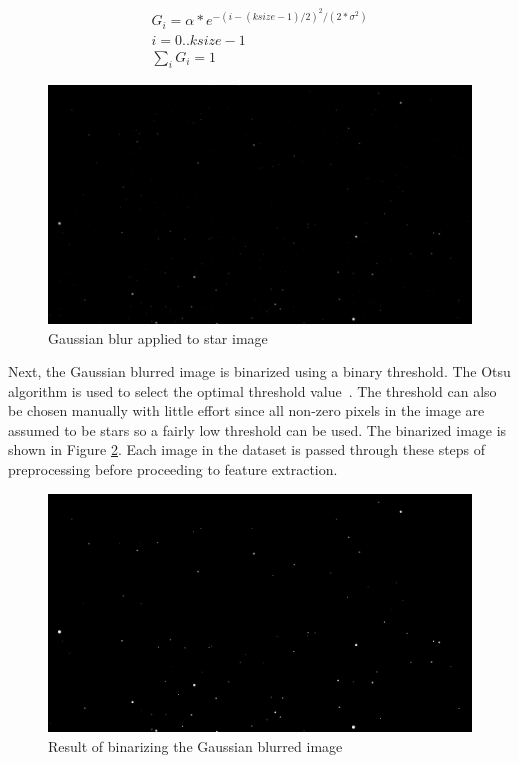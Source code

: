 \documentclass[10pt,twocolumn,letterpaper]{article}
\begin{document}
\begin{equation}
\begin{split}
  G_i = \alpha * e^{-(i-(ksize-1)/2)^2/(2*\sigma ^2)} \\
  i = 0..ksize-1\\
  \sum_i G_i = 1
  \label{eq:gauss}
\end{split}
\end{equation}

\begin{figure}[H]
  \centering
   \includegraphics[width=0.9\linewidth]{gauss}
   \caption{Gaussian blur applied to star image}
   \label{fig:star_gauss}
\end{figure}

Next, the Gaussian blurred image is binarized using a binary threshold. The Otsu algorithm is used to select the optimal threshold value~\cite{opencv}. The threshold can also be chosen manually with little effort since all non-zero pixels in the image are assumed to be stars so a fairly low threshold can be used. The binarized image is shown in Figure \ref{fig:star_binary}. Each image in the dataset is passed through these steps of preprocessing before proceeding to feature extraction.

\begin{figure}[H]
  \centering
   \includegraphics[width=0.9\linewidth]{binary}
   \caption{Result of binarizing the Gaussian blurred image}
   \label{fig:star_binary}
\end{figure}
\end{document}
